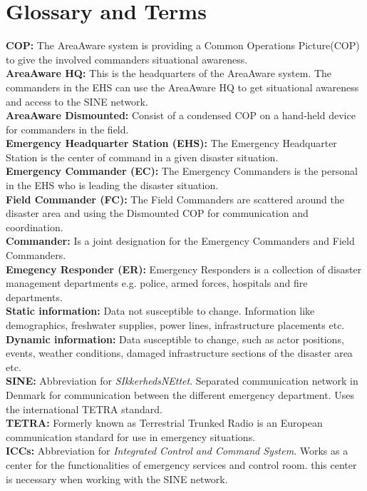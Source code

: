 
\chapter{Glossary and Terms}

\textbf{COP:} The AreaAware system is providing a Common Operations Picture(COP) to give the involved commanders situational awareness.\\

\noindent \textbf{AreaAware HQ:} This is the headquarters of the AreaAware system. The commanders in the EHS can use the AreaAware HQ to get situational awareness and access to the SINE network.\\

\noindent \textbf{AreaAware Dismounted:} Consist of a condensed COP on a hand-held device for commanders in the field.\\

\noindent \textbf{Emergency Headquarter Station (EHS):} The Emergency Headquarter Station is the center of command in a given disaster situation.\\

\noindent \textbf{Emergency Commander (EC):} The Emergency Commanders is the personal in the EHS who is leading the disaster situation.\\

\noindent \textbf{Field Commander (FC):} The Field Commanders are scattered around the disaster area and using the Dismounted COP for communication and coordination.\\

\noindent \textbf{Commander:} Is a joint designation for the Emergency Commanders and Field Commanders.\\

\noindent \textbf{Emegency Responder (ER):} Emergency Responders is a collection of disaster management departments e.g. police, armed forces, hospitals and fire departments.\\

\noindent \textbf{Static information:} Data not susceptible to change. Information like demographics, freshwater supplies, power lines, infrastructure placements etc.\\

\noindent \textbf{Dynamic information:} Data susceptible to change, such as actor positions, events, weather conditions, damaged infrastructure sections of the disaster area etc.\\

\noindent \textbf{SINE:} Abbreviation for \textit{SIkkerhedsNEttet}. Separated communication network in Denmark for communication between the different emergency department. Uses the international TETRA standard.\\

\noindent \textbf{TETRA:} Formerly known as Terrestrial Trunked Radio is an European communication standard for use in emergency situations.\\

\noindent \textbf{ICCs:} Abbreviation for \textit{Integrated Control and Command System}. Works as a center for the functionalities of emergency services and control room. this center is necessary when working with the SINE network.\\
